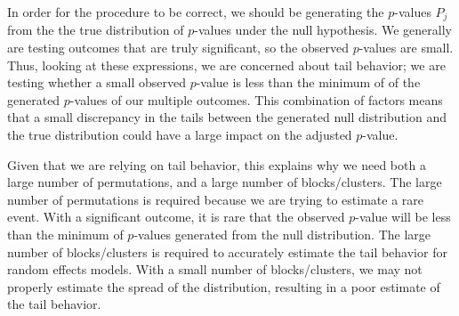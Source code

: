 \documentclass[
]{article}
\begin{document}
In order for the procedure to be correct, we should be generating the
\(p\)-values \(P_j\) from the the true distribution of \(p\)-values
under the null hypothesis. We generally are testing outcomes that are
truly significant, so the observed \(p\)-values are small. Thus, looking
at these expressions, we are concerned about tail behavior; we are
testing whether a small observed \(p\)-value is less than the minimum of
of the generated \(p\)-values of our multiple outcomes. This combination
of factors means that a small discrepancy in the tails between the
generated null distribution and the true distribution could have a large
impact on the adjusted \(p\)-value.

Given that we are relying on tail behavior, this explains why we need
both a large number of permutations, and a large number of
blocks/clusters. The large number of permutations is required because we
are trying to estimate a rare event. With a significant outcome, it is
rare that the observed \(p\)-value will be less than the minimum of
\(p\)-values generated from the null distribution. The large number of
blocks/clusters is required to accurately estimate the tail behavior for
random effects models. With a small number of blocks/clusters, we may
not properly estimate the spread of the distribution, resulting in a
poor estimate of the tail behavior.
\end{document}
